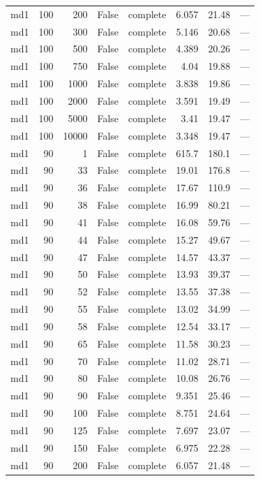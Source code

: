 \begin{tabular}{lrrrlrrl}
md1 & 100 & 200 & False & complete & 6.057 & 21.48 & — \\
md1 & 100 & 300 & False & complete & 5.146 & 20.68 & — \\
md1 & 100 & 500 & False & complete & 4.389 & 20.26 & — \\
md1 & 100 & 750 & False & complete & 4.04 & 19.88 & — \\
md1 & 100 & 1000 & False & complete & 3.838 & 19.86 & — \\
md1 & 100 & 2000 & False & complete & 3.591 & 19.49 & — \\
md1 & 100 & 5000 & False & complete & 3.41 & 19.47 & — \\
md1 & 100 & 10000 & False & complete & 3.348 & 19.47 & — \\
md1 & 90 & 1 & False & complete & 615.7 & 180.1 & — \\
md1 & 90 & 33 & False & complete & 19.01 & 176.8 & — \\
md1 & 90 & 36 & False & complete & 17.67 & 110.9 & — \\
md1 & 90 & 38 & False & complete & 16.99 & 80.21 & — \\
md1 & 90 & 41 & False & complete & 16.08 & 59.76 & — \\
md1 & 90 & 44 & False & complete & 15.27 & 49.67 & — \\
md1 & 90 & 47 & False & complete & 14.57 & 43.37 & — \\
md1 & 90 & 50 & False & complete & 13.93 & 39.37 & — \\
md1 & 90 & 52 & False & complete & 13.55 & 37.38 & — \\
md1 & 90 & 55 & False & complete & 13.02 & 34.99 & — \\
md1 & 90 & 58 & False & complete & 12.54 & 33.17 & — \\
md1 & 90 & 65 & False & complete & 11.58 & 30.23 & — \\
md1 & 90 & 70 & False & complete & 11.02 & 28.71 & — \\
md1 & 90 & 80 & False & complete & 10.08 & 26.76 & — \\
md1 & 90 & 90 & False & complete & 9.351 & 25.46 & — \\
md1 & 90 & 100 & False & complete & 8.751 & 24.64 & — \\
md1 & 90 & 125 & False & complete & 7.697 & 23.07 & — \\
md1 & 90 & 150 & False & complete & 6.975 & 22.28 & — \\
md1 & 90 & 200 & False & complete & 6.057 & 21.48 & — \\

\end{tabular}
